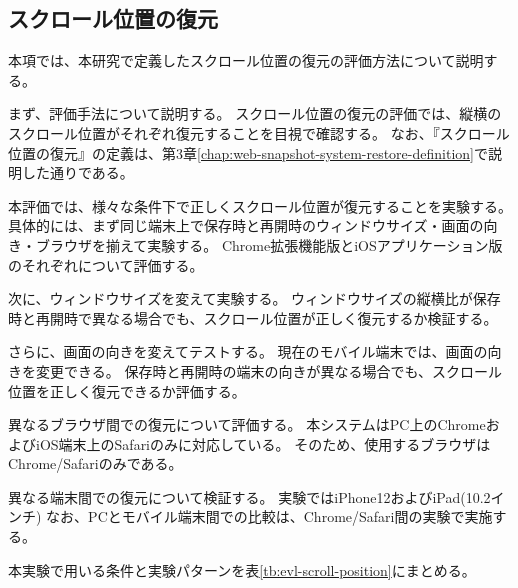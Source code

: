 \subsection{スクロール位置の復元}
本項では、本研究で定義したスクロール位置の復元の評価方法について説明する。

まず、評価手法について説明する。
スクロール位置の復元の評価では、縦横のスクロール位置がそれぞれ復元することを目視で確認する。
なお、『スクロール位置の復元』の定義は、第3章\ref{chap:web-snapshot-system-restore-definition}で説明した通りである。

本評価では、様々な条件下で正しくスクロール位置が復元することを実験する。
具体的には、まず同じ端末上で保存時と再開時のウィンドウサイズ・画面の向き・ブラウザを揃えて実験する。
Chrome拡張機能版とiOSアプリケーション版のそれぞれについて評価する。

次に、ウィンドウサイズを変えて実験する。
ウィンドウサイズの縦横比が保存時と再開時で異なる場合でも、スクロール位置が正しく復元するか検証する。

さらに、画面の向きを変えてテストする。
現在のモバイル端末では、画面の向きを変更できる。
保存時と再開時の端末の向きが異なる場合でも、スクロール位置を正しく復元できるか評価する。

異なるブラウザ間での復元について評価する。
本システムはPC上のChromeおよびiOS端末上のSafariのみに対応している。
そのため、使用するブラウザはChrome/Safariのみである。

異なる端末間での復元について検証する。
実験ではiPhone12\cite{iphone12}およびiPad(10.2インチ)\cite{ipad}
なお、PCとモバイル端末間での比較は、Chrome/Safari間の実験で実施する。

本実験で用いる条件と実験パターンを表\ref{tb:evl-scroll-position}にまとめる。

